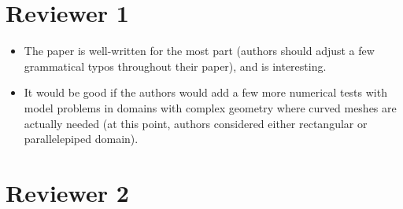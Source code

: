 \documentclass{article}
\newcommand{\note}[1]{{\color{blue}{#1}}}
\begin{document}

\note{We thank both Reviewers 1 and 2 for their feedback.  We describe steps taken to address reviewer comments and suggestions, which are described in the following response.  Revisions in the manuscript are also colored for ease of identification.  We hope these revisions improve the readability of this paper and its suitability for the audience of SISC.}

\section{Reviewer 1}

\begin{itemize}
\item The paper is well-written for the most part (authors should adjust a few grammatical typos throughout their paper), and is interesting. 
\item It would be good if the authors would add a few more numerical tests with model problems in domains with complex geometry where curved meshes are actually needed (at this point, authors considered either rectangular or parallelepiped domain).
\end{itemize}

\section{Reviewer 2}
\end{document}
